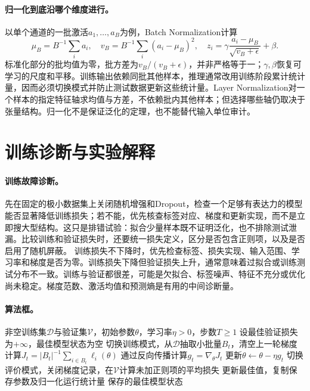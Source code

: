 \paragraph{归一化到底沿哪个维度进行。}
以单个通道的一批激活$a_1,\ldots,a_B$为例，Batch Normalization计算
\begin{equation}
 \mu_B=B^{-1}\sum_i a_i,\quad
 v_B=B^{-1}\sum_i(a_i-\mu_B)^2,\quad
 z_i=\gamma\frac{a_i-\mu_B}{\sqrt{v_B+\epsilon}}+\beta.
\end{equation}
标准化部分的批均值为零，批方差为$v_B/(v_B+\epsilon)$，并非严格等于一；$\gamma,\beta$恢复可学习的尺度和平移。训练输出依赖同批其他样本，推理通常改用训练阶段累计统计量，因而必须切换模式并防止测试数据更新这些统计量。Layer Normalization对一个样本的指定特征轴求均值与方差，不依赖批内其他样本；但选择哪些轴仍取决于张量结构。归一化不是保证泛化的定理，也不能替代输入单位审计。

\section{训练诊断与实验解释}
\paragraph{训练故障诊断。}
先在固定的极小数据集上关闭随机增强和Dropout，检查一个足够有表达力的模型能否显著降低训练损失；若不能，优先核查标签对应、梯度和更新实现，而不是立即搜大型结构。这只是排错试验：拟合少量样本既不证明泛化，也不排除测试泄漏。比较训练和验证损失时，还要统一损失定义，区分是否包含正则项，以及是否启用了随机屏蔽。
训练损失不下降时，优先检查标签、损失实现、输入范围、学习率和梯度是否为零。训练损失下降但验证损失上升，通常意味着过拟合或训练测试分布不一致。训练与验证都很差，可能是欠拟合、标签噪声、特征不充分或优化尚未稳定。梯度范数、激活均值和预测熵是有用的中间诊断量。

\paragraph{算法框。}
\begin{algorithm}
\caption{小批量梯度训练的基本流程}
\begin{algorithmic}[1]
\Require 非空训练集$\mathcal{D}$与验证集$\mathcal V$，初始参数$\theta$，学习率$\eta>0$，步数$T\geq1$
\State 设最佳验证损失为$+\infty$，最佳模型状态为空
  \State 切换训练模式，从$\mathcal{D}$抽取小批量$B_t$，清空上一轮梯度
  \State 计算$J_t=|B_t|^{-1}\sum_{i\in B_t}\ell_i(\theta)$
  \State 通过反向传播计算$g_t=\nabla_\theta J_t$
  \State 更新$\theta\leftarrow\theta-\eta g_t$
  \State 切换评价模式，关闭梯度记录，在$\mathcal V$计算未加正则项的平均损失
    \State 更新最佳值，复制保存参数及归一化运行统计量
  \EndIf
\EndFor
\State \Return 保存的最佳模型状态
\end{algorithmic}
\end{algorithm}


